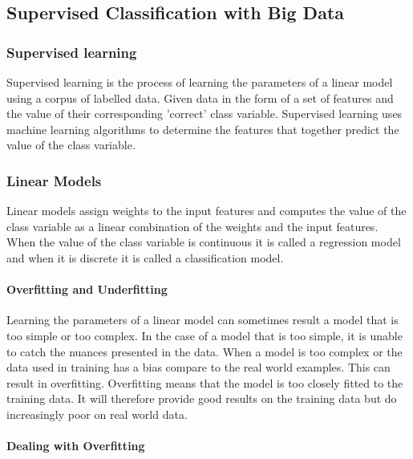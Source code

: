 \subsection{Supervised Classification with Big Data}

\subsubsection{Supervised learning}
Supervised learning is the process of learning the parameters of a linear model using a corpus of labelled data.
Given data in the form of a set of features and the value of their corresponding 'correct' class variable.  
Supervised learning uses machine learning algorithms to determine the features that together predict the value of the class variable.  

\subsubsection{Linear Models}

Linear models assign weights to the input features and computes the value of the class variable as a linear combination of the weights and the input features.
When the value of the class variable is continuous it is called a regression model and when it is discrete it is called a classification model.


\paragraph{Overfitting and Underfitting}
Learning the parameters of a linear model can sometimes result a model that is too simple or too complex.
In the case of a model that is too simple, it is unable to catch the nuances presented in the data.
When a model is too complex or the data used in training has a bias compare to the real world examples.
This can result in overfitting.
Overfitting means that the model is too closely fitted to the training data.
It will therefore provide good results on the training data but do increasingly poor on real world data.

\paragraph{Dealing with Overfitting}

